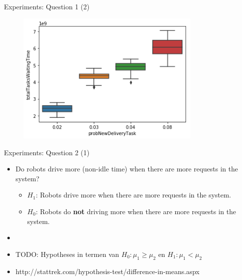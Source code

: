 \begin{frame}{Experiments: Question 1 (2)}
  \begin{figure}[hbt]
  \includegraphics[width=9cm]{imgs/question1-plot1}
\end{figure}

\end{frame}


\begin{frame}{Experiments: Question 2 (1)}
    \begin{itemize}
        \item Do robots drive more (non-idle time) when there are more requests in the system?
        \begin{itemize}
                \item $H_1$: Robots drive more when there are more requests in the system.
                \item $H_0$: Robots do \textbf{not} driving more when there are more requests in the system.
        \end{itemize}

        \item[]
        \item TODO: Hypotheses in termen van $H_0: \mu_1 \geq \mu_2$ en $H_1: \mu_1 < \mu_2$
        \item http://stattrek.com/hypothesis-test/difference-in-means.aspx
    \end{itemize}
\end{frame}



